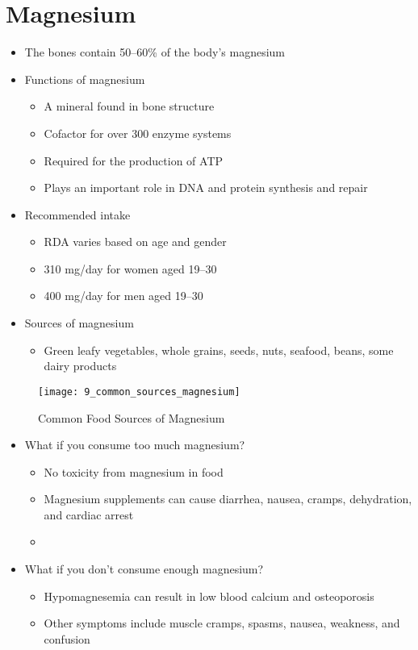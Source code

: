 \documentclass[title={Chapter 9}]{fdsn201notes}
\begin{document}
\section{Magnesium}\label{sec:Magnesium}
\begin{itemize}
	\item The bones contain 50--60\% of the body’s magnesium
	\item Functions of magnesium
	\begin{itemize}
		\item A mineral found in bone structure
		\item Cofactor for over 300 enzyme systems
		\item Required for the production of ATP
		\item Plays an important role in DNA and protein synthesis and repair
	\end{itemize}
	\item Recommended intake
	\begin{itemize}
		\item RDA varies based on age and gender
		\item 310 mg/day for women aged 19--30
		\item 400 mg/day for men aged 19--30
	\end{itemize}
	\item Sources of magnesium
	\begin{itemize}
		\item Green leafy vegetables, whole grains, seeds, nuts, seafood, beans, some dairy products
	\end{itemize}
\end{itemize}

\begin{figure}[H]
	\centering
	\texttt{[image: 9\_common\_sources\_magnesium]}
	\caption{Common Food Sources of Magnesium}
	\label{fig:magnesium-common-food-sources}
\end{figure}

\begin{itemize}
	\item What if you consume too much magnesium?
	\begin{itemize}
		\item No toxicity from magnesium in food
		\item Magnesium supplements can cause diarrhea, nausea, cramps, dehydration, and cardiac arrest
		\item {}
	\end{itemize}
	\item What if you don’t consume enough magnesium?
	\begin{itemize}
		\item Hypomagnesemia can result in low blood calcium and osteoporosis
		\item Other symptoms include muscle cramps, spasms, nausea, weakness, and confusion
	\end{itemize}
\end{itemize}
\end{document}
